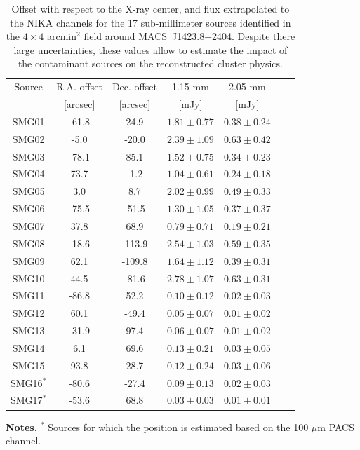 \documentclass[twocolumn,traditabstract]{aa}
\begin{document}
\begin{table}[h]
\caption{Offset with respect to the X-ray center, and flux extrapolated to the NIKA channels for the 17 sub-millimeter sources identified in the $4 \times 4$ arcmin$^2$ field around \mbox{MACS~J1423.8+2404}. Despite there large uncertainties, these values allow to estimate the impact of the contaminant sources on the reconstructed cluster physics.}
\begin{center}
\begin{tabular}{ccccccc}
\hline
\hline
Source &  R.A. offset & Dec. offset & 1.15 mm & 2.05 mm\\
 &  [arcsec] & [arcsec] & [mJy] & [mJy] \\
\hline
SMG01 &    -61.8 &     24.9 & $    1.81 \pm     0.77$ & $    0.38 \pm     0.24$ \\
SMG02 &     -5.0 &    -20.0 & $    2.39 \pm     1.09$ & $    0.63 \pm     0.42$ \\
SMG03 &    -78.1 &     85.1 & $    1.52 \pm     0.75$ & $    0.34 \pm     0.23$ \\
SMG04 &     73.7 &     -1.2 & $    1.04 \pm     0.61$ & $    0.24 \pm     0.18$ \\
SMG05 &      3.0 &      8.7 & $    2.02 \pm     0.99$ & $    0.49 \pm     0.33$ \\
SMG06 &    -75.5 &    -51.5 & $    1.30 \pm     1.05$ & $    0.37 \pm     0.37$ \\
SMG07 &     37.8 &     68.9 & $    0.79 \pm     0.71$ & $    0.19 \pm     0.21$ \\
SMG08 &    -18.6 &   -113.9 & $    2.54 \pm     1.03$ & $    0.59 \pm     0.35$ \\
SMG09 &     62.1 &   -109.8 & $    1.64 \pm     1.12$ & $    0.39 \pm     0.31$ \\
SMG10 &     44.5 &    -81.6 & $    2.78 \pm     1.07$ & $    0.63 \pm     0.31$ \\
SMG11 &    -86.8 &     52.2 & $    0.10 \pm     0.12$ & $    0.02 \pm     0.03$ \\
SMG12 &     60.1 &    -49.4 & $    0.05 \pm     0.07$ & $    0.01 \pm     0.02$ \\
SMG13 &    -31.9 &     97.4 & $    0.06 \pm     0.07$ & $    0.01 \pm     0.02$ \\
SMG14 &      6.1 &     69.6 & $    0.13 \pm     0.21$ & $    0.03 \pm     0.05$ \\
SMG15 &     93.8 &     28.7 & $    0.12 \pm     0.24$ & $    0.03 \pm     0.06$ \\
SMG16$^*$ &    -80.6 &    -27.4 & $    0.09 \pm     0.13$ & $    0.02 \pm     0.03$ \\
SMG17$^*$ &    -53.6 &     68.8 & $    0.03 \pm     0.03$ & $    0.01 \pm     0.01$ \\
\hline
\end{tabular}
\end{center}
{\small {\bf Notes.} $^*$ Sources for which the position is estimated based on the 100 $\mu$m PACS channel.}
\label{tab:IR_ps2}
\end{table}
\end{document}
